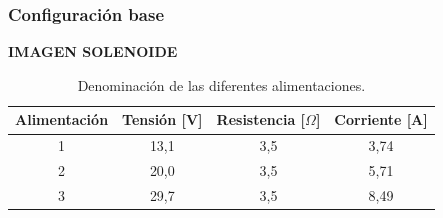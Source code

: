 \subsubsection*{Configuración base}

\textbf{IMAGEN SOLENOIDE}

\newpage


\begin{table}[H]
    \centering
    \setlength{\tabcolsep}{5pt}
    \renewcommand{\arraystretch}{1.2}
    \begin{tabular}{|c|c|c|c|}
        \hline
        \textbf{Alimentación} & \textbf{Tensión [V]} & \textbf{Resistencia [\(\Omega\)]} & \textbf{Corriente [A]}\\
        \hline
        1 & 13,1 & 3,5 & 3,74 \\
        2 & 20,0 & 3,5 & 5,71 \\
        3 & 29,7 & 3,5 & 8,49\\
        \hline
    \end{tabular}
    \caption{Denominación de las diferentes alimentaciones.}
    \label{tab:alimentacionesBase}
\end{table}

